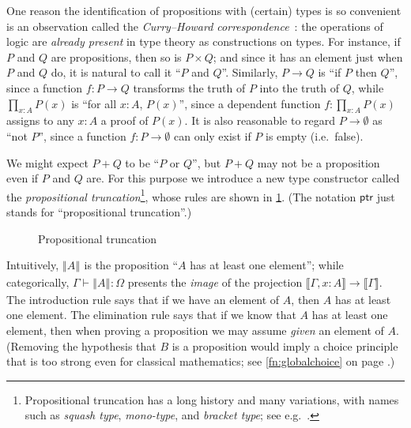 \documentclass[12pt]{article}
\let\jdeq\equiv
\def\ty{\;\mathsf{type}}
\def\m#1{\llbracket#1\rrbracket}
\def\types{\vdash}
\def\equiv{\mathsf{Equiv}}
\numberwithin{equation}{section}
\newcommand{\trunc}[2]{\mathopen{}\left\Vert #2\right\Vert_{#1}\mathclose{}}
\newcommand{\tproj}[3][]{\mathopen{}\left|#3\right|_{#2}^{#1}\mathclose{}}
\newcommand{\brck}[1]{\trunc{}{#1}}
\newcommand{\bproj}[1]{\tproj{}{#1}}
\begin{document}
One reason the identification of propositions with (certain) types is so con\-venient is an observation called the \emph{Curry--Howard correspondence}~\cite{curry:curry-howard,howard:curry-howard,martinlof:itt-pred,wadler:pat}: the operations of logic are \emph{already present} in type theory as constructions on types.
For instance, if $P$ and $Q$ are propositions, then so is $P\times Q$; and since it has an element just when $P$ and $Q$ do, it is natural to call it ``$P$ and $Q$''. %
Similarly, $P\to Q$ is ``if $P$ then $Q$'', since a function $f:P\to Q$ transforms the truth of $P$ into the truth of $Q$, while $\prod_{x:A} P(x)$ is ``for all $x:A$, $P(x)$'', since a dependent function $f:\prod_{x:A} P(x)$ assigns to any $x:A$ a proof of $P(x)$.
It is also reasonable to regard $P\to \emptyset$ as ``not $P$'', since a function $f:P\to \emptyset$ can only exist if $P$ is empty (i.e.\ false).

We might expect $P+Q$ to be ``$P$ or $Q$'', but $P+Q$ may not be a proposition even if $P$ and $Q$ are.
For this purpose we introduce a new type constructor called the \emph{propositional truncation}\footnote{Propositional truncation has a long history and many variations, with names such as \emph{squash type}, \emph{mono-type}, and \emph{bracket type}; see e.g.~\cite{nuprlbook,mendler:quotient-types,maietti:tt-hpretop,ab:bracket-types,hottbook}.}, whose rules are shown in \cref{fig:brck}.
(The notation $\mathsf{ptr}$ just stands for ``propositional truncation''.)
\begin{figure}
  \centering
  \caption{Propositional truncation}
  \label{fig:brck}
\end{figure}
Intuitively, $\brck A$ is the proposition ``$A$ has at least one element''; while categorically, $\Gamma\types \brck A: \Omega$ presents the \emph{image} of the projection $\m{\Gamma,x:A} \to \m{\Gamma}$.
The introduction rule says that if we have an element of $A$, then $A$ has at least one element.
The elimination rule says that if we know that $A$ has at least one element, then when proving a proposition we may assume \emph{given} an element of $A$.
(Removing the hypothesis that $B$ is a proposition would imply a choice principle that is too strong even for classical mathematics; see \cref{fn:globalchoice} on page \pageref{fn:globalchoice}.)
\end{document}
